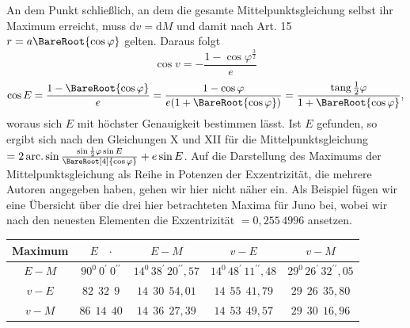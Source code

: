 An dem Punkt schließlich, an dem die gesamte Mittelpunktsgleichung selbst ihr Maximum erreicht, muss $\mathrm{d}v=\mathrm{d}M$ und damit nach Art. 15 $r=a\BareRoot{\cos\varphi}$ gelten. Daraus folgt
\[
\cos v=-\frac{1-\cos\varphi^{\frac{3}{2}}}{e}
\]
\[
\cos E=\frac{1-\BareRoot{\cos\varphi}}{e}=\frac{1-\cos\varphi}{e(1+\BareRoot{\cos\varphi})}=\frac{\operatorname{tang}\frac{1}{2}\varphi}{1+\BareRoot{\cos\varphi}},
\]
woraus sich $E$ mit höchster Genauigkeit bestimmen lässt. Ist $E$ gefunden, so ergibt sich nach den Gleichungen X und XII für die Mittelpunktsgleichung $=2\operatorname{arc.}\sin\frac{\sin\frac{1}{2}\varphi\sin E}{\BareRoot[4]{\cos\varphi}}+e\sin E$\HistoricalNoteEight{Handschriftliche Bemerkung:] $\sin E=\BareRoot{\frac{\cos\varphi+2\BareRoot{\cos\varphi}+\cos\varphi^{\frac{3}{2}}}{(1+\BareRoot{\cos\varphi})(1+\cos\varphi)}},$ Mittelpunktsgleichung $=2\operatorname{arc.}\sin\BareRoot{\left(\frac{1}{1+\cos\varphi}-\frac{\BareRoot[4]{(1-e e)}}{2}\right)}+e\sin E=\operatorname{arc.}\cos\frac{-1+\BareRoot{\cos\varphi}+\cos\varphi+\cos\varphi^{\frac{3}{2}}}{1+\cos\varphi}+e\sin E=\operatorname{arc.}\sin(\operatorname{tg}\frac{1}{2}\varphi^2\operatorname{tg}E)+e\sin E.$}. Auf die Darstellung des Maximums der Mittelpunktsgleichung als Reihe in Potenzen der Exzentrizität, die mehrere Autoren angegeben haben, gehen wir hier nicht näher ein. Als Beispiel fügen wir eine Übersicht über die drei hier betrachteten Maxima für Juno bei, wobei wir nach den neuesten Elementen die Exzentrizität $=0{,}255\,4996$ ansetzen.
\begin{center}
\footnotesize
\setlength{\tabcolsep}{3pt}
\renewcommand{\arraystretch}{1.3}
\begin{tabular}{|c|c|c|c|c|}
\hline
Maximum & $E\quad\text{·}$ & $E-M$ & $v-E$ & $v-M$\\
\hline
$E-M$ & $90^0\ 0^{\prime}\ 0^{\prime\prime}$ & $14^0\,38^{\prime}\,20^{\prime\prime}{,}57$ & $14^0\,48^{\prime}\,11^{\prime\prime}{,}48$ & $29^0\,26^{\prime}\,32^{\prime\prime}{,}05$\\
$v-E$ & $82\ \ 32\ \ 9$ & $14\ \ 30\ \ 54{,}01$ & $14\ \ 55\ \ 41{,}79$ & $29\ \ 26\ \ 35{,}80$\\
$v-M$ & $86\ \ 14\ \ 40$ & $14\ \ 36\ \ 27{,}39$ & $14\ \ 53\ \ 49{,}57$ & $29\ \ 30\ \ 16{,}96$\\
\hline
\end{tabular}
\end{center}
